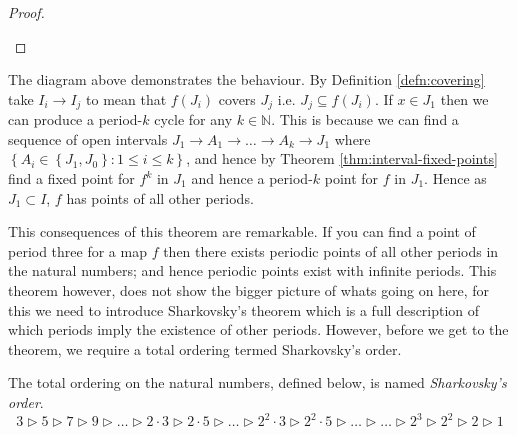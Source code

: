 \begin{thm}
\begin{proof}
        \begin{center}
        \end{center}

    \end{proof}

\end{thm}
The diagram above demonstrates the behaviour. By Definition \ref{defn:covering} take $I_i \to I_j$ to mean that $f(J_i)$ covers $J_j$ i.e. $J_j \subseteq f(J_i)$. If $x \in J_1$ then we can produce a period-$k$ cycle for any $k \in \mathbb{N}$. This is because we can find a sequence of open intervals $J_1 \to A_1 \to \dots \to A_k \to J_1$ where $\left\lbrace A_i \in \left\lbrace J_1, J_0 \right\rbrace : 1 \leq i \leq k \right\rbrace$, and hence by Theorem \ref{thm:interval-fixed-points} find a fixed point for $f^k$ in $J_1$ and hence a period-$k$ point for $f$ in $J_1$. Hence as $J_1 \subset I$, $f$ has points of all other periods.

This consequences of this theorem are remarkable. If you can find a point of period three for a map $f$ then there exists periodic points of all other periods in the natural numbers; and hence periodic points exist with infinite periods. This theorem however, does not show the bigger picture of whats going on here, for this we need to introduce Sharkovsky's theorem which is a full description of which periods imply the existence of other periods. However, before we get to the theorem, we require a total ordering termed Sharkovsky's order.

\begin{defn}
    The total ordering on the natural numbers, defined below, is named \emph{Sharkovsky's order}. \[ 3 \rhd 5 \rhd 7 \rhd 9 \rhd \dots \rhd 2 \cdot 3 \rhd 2 \cdot 5 \rhd \dots \rhd 2^2 \cdot 3 \rhd 2^2 \cdot 5 \rhd \dots \rhd \dots \rhd 2^3 \rhd 2^2 \rhd 2 \rhd 1 \]
\end{defn}

